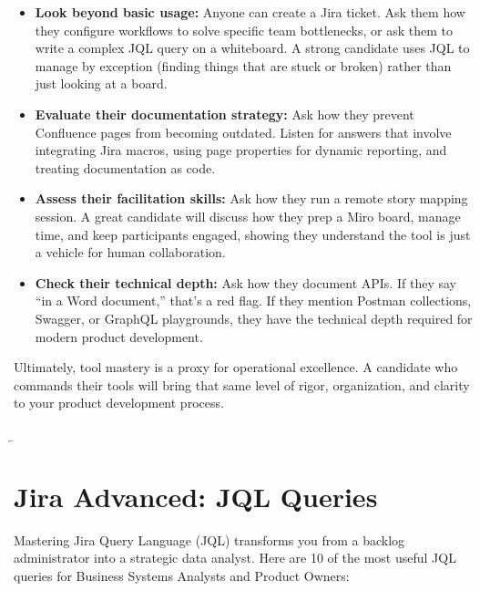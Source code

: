 \documentclass[
  11pt,
  openany,
  oneside]{book}
\providecommand{\tightlist}{%
  \setlength{\itemsep}{0pt}\setlength{\parskip}{0pt}}
\begin{document}
\begin{itemize}
\tightlist
\item
  \textbf{Look beyond basic usage:} Anyone can create a Jira ticket. Ask
  them how they configure workflows to solve specific team bottlenecks,
  or ask them to write a complex JQL query on a whiteboard. A strong
  candidate uses JQL to manage by exception (finding things that are
  stuck or broken) rather than just looking at a board.
\item
  \textbf{Evaluate their documentation strategy:} Ask how they prevent
  Confluence pages from becoming outdated. Listen for answers that
  involve integrating Jira macros, using page properties for dynamic
  reporting, and treating documentation as code.
\item
  \textbf{Assess their facilitation skills:} Ask how they run a remote
  story mapping session. A great candidate will discuss how they prep a
  Miro board, manage time, and keep participants engaged, showing they
  understand the tool is just a vehicle for human collaboration.
\item
  \textbf{Check their technical depth:} Ask how they document APIs. If
  they say ``in a Word document,'' that's a red flag. If they mention
  Postman collections, Swagger, or GraphQL playgrounds, they have the
  technical depth required for modern product development.
\end{itemize}

Ultimately, tool mastery is a proxy for operational excellence. A
candidate who commands their tools will bring that same level of rigor,
organization, and clarity to your product development process.

\b

\section{Jira Advanced: JQL Queries}\label{jira-advanced-jql-queries}

Mastering Jira Query Language (JQL) transforms you from a backlog
administrator into a strategic data analyst. Here are 10 of the most
useful JQL queries for Business Systems Analysts and Product Owners:
\end{document}
